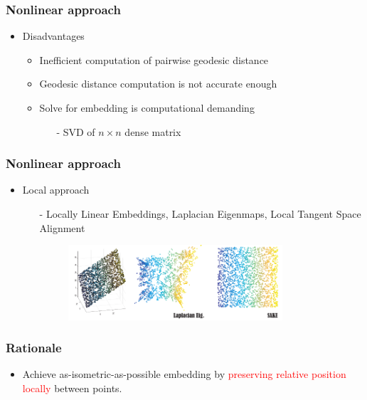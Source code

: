 \documentclass[serif,mathserif, 12pt]{beamer}
\newcommand{\TODO}[1]{\textcolor{red}{#1}}
\begin{document}
\begin{frame}
  \frametitle{Nonlinear approach}
  \begin{itemize}
  \item Disadvantages
    \begin{itemize}
    \item Inefficient computation of pairwise geodesic distance
    \item Geodesic distance computation is not accurate enough
    \item Solve for embedding is computational demanding
      \begin{itemize}
      \item[-] SVD of $n\times n$ dense matrix
      \end{itemize}
    \end{itemize}
  \end{itemize}
\end{frame}

\begin{frame}
  \frametitle{Nonlinear approach}
  \begin{itemize}
  \item Local approach
    \begin{itemize}
    \item[-] Locally Linear Embeddings, Laplacian Eigenmaps, Local Tangent Space Alignment
      \begin{figure}
        \centering
        \includegraphics[width=0.8\textwidth]{img/affine_precision}
      \end{figure}
    \end{itemize}
  \end{itemize}
\end{frame}

\begin{frame}
  \frametitle{Rationale}
  \begin{itemize}
  \item Achieve as-isometric-as-possible embedding by \TODO{preserving relative position locally}
    between points.
  \end{itemize}
\end{frame}
\end{document}
